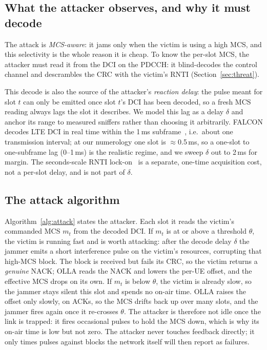 \documentclass[conference]{IEEEtran}
\begin{document}
\subsection{What the attacker observes, and why it must decode}
The attack is \emph{MCS-aware}: it jams only when the victim is using a high MCS, and
this selectivity is the whole reason it is cheap. To know the per-slot MCS, the attacker
must read it from the DCI on the PDCCH: it blind-decodes the control channel and
descrambles the CRC with the victim's RNTI (Section~\ref{sec:threat}).

This decode is also the source of the attacker's \emph{reaction delay}: the pulse meant
for slot $t$ can only be emitted once slot $t$'s DCI has been decoded, so a fresh MCS
reading always lags the slot it describes. We model this lag as a delay $\delta$ and
anchor its range to measured sniffers rather than choosing it arbitrarily. FALCON decodes
LTE DCI in real time within the 1\,ms subframe~\cite{falkenberg2019falcon}, i.e.\ about
one transmission interval; at our numerology one slot is $\approx$0.5\,ms, so a one-slot
to one-subframe lag (0--1\,ms) is the realistic regime, and we sweep $\delta$ out to
2\,ms for margin. The seconds-scale RNTI lock-on~\cite{ludant2023sniffing} is a separate,
one-time acquisition cost, not a per-slot delay, and is not part of $\delta$.

\subsection{The attack algorithm}
Algorithm~\ref{alg:attack} states the attacker. Each slot it reads the victim's commanded
MCS $m_t$ from the decoded DCI. If $m_t$ is at or above a threshold $\theta$, the victim
is running fast and is worth attacking: after the decode delay $\delta$ the jammer emits a
short interference pulse on the victim's resources, corrupting that high-MCS block. The
block is received but fails its CRC, so the victim returns a \emph{genuine} NACK; OLLA
reads the NACK and lowers the per-UE offset, and the effective MCS drops on its own. If
$m_t$ is below $\theta$, the victim is already slow, so the jammer stays silent this slot
and spends no on-air time. OLLA raises the offset only slowly, on ACKs, so the MCS drifts
back up over many slots, and the jammer fires again once it re-crosses $\theta$. The
attacker is therefore not idle once the link is trapped: it fires occasional pulses to
hold the MCS down, which is why its on-air time is low but not zero. The attacker never
touches feedback directly; it only times pulses against blocks the network itself will
then report as failures.
\end{document}
